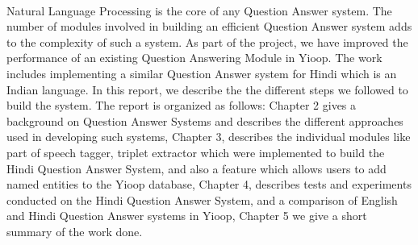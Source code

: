\paragraph{}
Natural Language Processing is the core of any Question Answer system. The number of modules involved in building an efficient Question Answer system adds to the complexity of such a system. As part of the project, we have improved the performance of an existing Question Answering Module \cite {patel2015question} in Yioop. The work includes implementing a similar Question Answer system for Hindi which is an Indian language. In this report, we describe the the different steps we followed to build the system. The report is organized as follows: Chapter 2 gives a background on Question Answer Systems and describes the different approaches used in developing such systems, Chapter 3, describes the individual modules  like part of speech tagger, triplet extractor which were implemented to build the Hindi Question Answer System, and also a feature which allows users to add named entities to the Yioop database, Chapter 4, describes tests and experiments conducted on the Hindi Question Answer System, and a comparison of English and Hindi Question Answer systems in Yioop, Chapter 5 we give a short summary of the work done.

